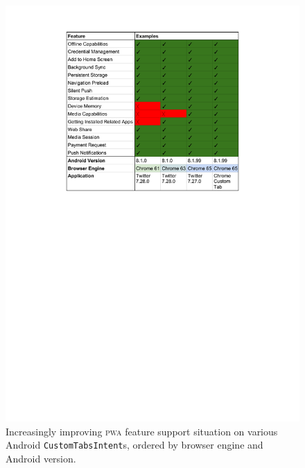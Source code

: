 \documentclass[sigconf]{acmart}
\begin{document}
\begin{figure}[htb]
  \renewcommand{\figurename}{Table}
  \begin{center}
  \centerline{\includegraphics[width=.65\columnwidth,trim=4.3cm 16.25cm 4.3cm 1.5cm, clip]{custom-tab-results.pdf}}
  \caption{Increasingly improving \textsc{pwa} feature support situation
    on various Android \texttt{CustomTabsIntent}s,
    ordered by browser engine and Android version.}
  \label{table:customtab}
  \end{center}
\end{figure}
\end{document}
